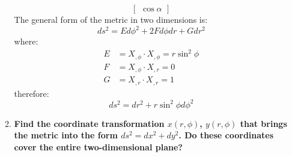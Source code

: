 \documentclass[9pt]{report}
\begin{document}
\begin{enumerate}
\begin{enumerate}
\[\begin{bmatrix}
            \cos\alpha
          \end{bmatrix}
        \]
        The general form of the metric in two dimensions is:
        \[
          ds^2 = E d\phi^2 + 2F d\phi dr + G dr^2
        \]
        where:
        \[
          \begin{align}
            E &= X_{,\phi} \cdot X_{,\phi} = r\sin^2\phi \\
            F &= X_{,\phi} \cdot X_{,r} = 0\\
            G &= X_{,r} \cdot X_{,r} = 1
          \end{align}
        \]
        therefore:
        \[
          ds^2 = dr^2 + r\sin^2\phi d\phi^2
        \]

      \item \textbf{Find the coordinate transformation $x(r,\phi)$,
          $y(r,\phi)$ that brings the metric into the form $ds^2
        = dx^2+dy^2$. Do these coordinates cover the entire
        two-dimensional plane?}


\end{enumerate}
\end{enumerate}
\end{document}

